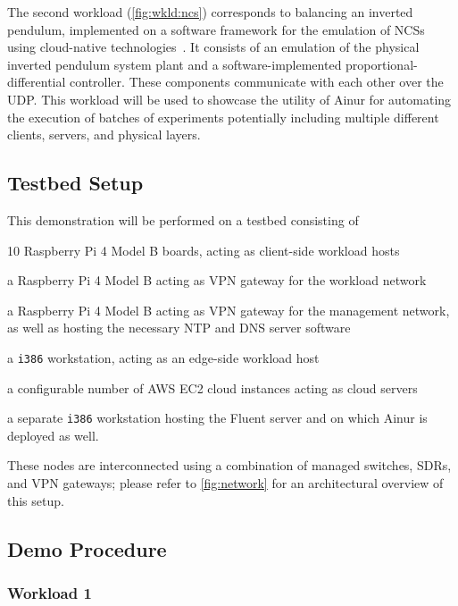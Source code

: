 The second workload (\cref{fig:wkld:ncs}) corresponds to  balancing an inverted pendulum, implemented on a software framework for the emulation of \glspl{NCS} using cloud-native technologies~\cite{cleave}.
It consists of an emulation of the physical inverted pendulum system plant and a software-implemented proportional-differential controller.
These components communicate with each other over the \gls{UDP}.
This workload will be used to showcase the utility of Ainur for automating the execution of batches of experiments potentially including multiple different clients, servers, and physical layers.

\subsection{Testbed Setup}

This demonstration will be performed on a testbed consisting of
\begin{enumerate*}[itemjoin={{; }}, itemjoin*={{; and finally }}]
    \item \num{10} Raspberry Pi 4 Model B boards, acting as client-side workload hosts
    \item a Raspberry Pi 4 Model B acting as \gls{VPN} gateway for the workload network
    \item a Raspberry Pi 4 Model B acting as \gls{VPN} gateway for the management network, as well as hosting the necessary \gls{NTP} and \gls{DNS} server software
    \item a \texttt{i386} workstation, acting as an edge-side workload host
    \item a configurable number of  \gls{AWS} \gls{EC2} cloud instances acting as cloud servers
    \item a separate \texttt{i386} workstation hosting the Fluent server and on which Ainur is deployed as well.
\end{enumerate*}
These nodes are interconnected using a combination of managed switches, \glspl{SDR}, and \gls{VPN} gateways; please refer to \cref{fig:network} for an architectural overview of this setup.


\subsection{Demo Procedure}

\subsubsection{Workload 1}

